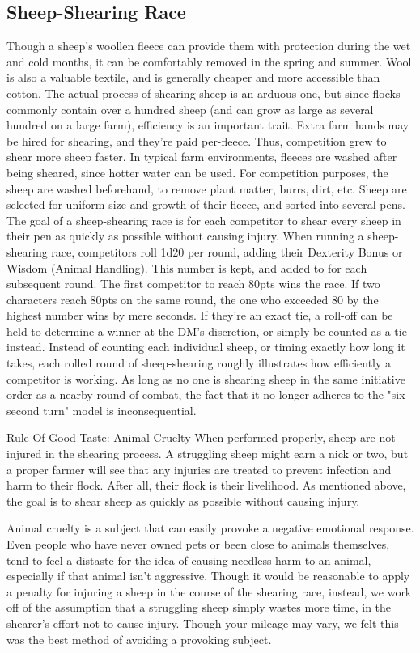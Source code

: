 \documentclass[10pt,a4paper,twoside,bg=print,twocolumn,openany,nodeprecatedcode]{dndbook}
\begin{document}
\subsection{Sheep-Shearing Race}
Though a sheep's woollen fleece can provide them with protection during the wet and cold months, it can be comfortably removed in the spring and summer. Wool is also a valuable textile, and is generally cheaper and more accessible than cotton.
The actual process of shearing sheep is an arduous one, but since flocks commonly contain over a hundred sheep (and can grow as large as several hundred on a large farm), efficiency is an important trait. Extra farm hands may be hired for shearing, and they're paid per-fleece. Thus, competition grew to shear more sheep faster.
In typical farm environments, fleeces are washed after being sheared, since hotter water can be used. For competition purposes, the sheep are washed beforehand, to remove plant matter, burrs, dirt, etc. Sheep are selected for uniform size and growth of their fleece, and sorted into several pens. The goal of a sheep-shearing race is for each competitor to shear every sheep in their pen as quickly as possible without causing injury.
When running a sheep-shearing race, competitors roll 1d20 per round, adding their Dexterity Bonus or Wisdom (Animal Handling). This number is kept, and added to for each subsequent round. The first competitor to reach 80pts wins the race. If two characters reach 80pts on the same round, the one who exceeded 80 by the highest number wins by mere seconds. If they're an exact tie, a roll-off can be held to determine a winner at the DM's discretion, or simply be counted as a tie instead.
Instead of counting each individual sheep, or timing exactly how long it takes, each rolled round of sheep-shearing roughly illustrates how efficiently a competitor is working. As long as no one is shearing sheep in the same initiative order as a nearby round of combat, the fact that it no longer adheres to the "six-second turn" model is inconsequential.
\begin{DndSidebar}[float=!b]{Rule Of Good Taste: Animal Cruelty}
When performed properly, sheep are not injured in the shearing process. A struggling sheep might earn a nick or two, but a proper farmer will see that any injuries are treated to prevent infection and harm to their flock. After all, their flock is their livelihood. As mentioned above, the goal is to shear sheep as quickly as possible without causing injury.


Animal cruelty is a subject that can easily provoke a negative emotional response. Even people who have never owned pets or been close to animals themselves, tend to feel a distaste for the idea of causing needless harm to an animal, especially if that animal isn't aggressive. Though it would be reasonable to apply a penalty for injuring a sheep in the course of the shearing race, instead, we work off of the assumption that a struggling sheep simply wastes more time, in the shearer's effort not to cause injury. Though your mileage may vary, we felt this was the best method of avoiding a provoking subject.


\end{DndSidebar}
\end{document}
